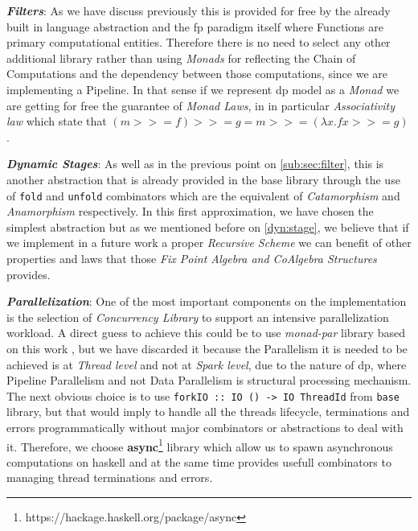 \documentclass[preprint]{elsarticle}
\begin{document}
\textbf{\textit{Filters}}\label{sub:sec:filter}: As we have discuss previously this is provided for free by the already built in language abstraction and the \acrshort{fp} paradigm itself where Functions are primary computational entities. Therefore there is no need to select any other additional library rather than using \emph{Monads} \citep{monads} for reflecting the Chain of Computations and the dependency between those computations, since we are implementing a Pipeline. In that sense if we represent \acrshort{dp} model as a \emph{Monad} we are getting for free the guarantee of \emph{Monad Laws}, in in particular \emph{Associativity law} which state that $(m >>= f ) >>= g = m >>= (\lambda x.f x >>= g)$ \citep{monadlaws}.

\textbf{\textit{Dynamic Stages}}: As well as in the previous point on \autoref{sub:sec:filter}, this is another abstraction that is already provided in the base library through the use of \texttt{fold} and \texttt{unfold} combinators which are the equivalent of \emph{Catamorphism} and \emph{Anamorphism} respectively. In this first approximation, we have chosen the simplest abstraction but as we mentioned before on \autoref{dyn:stage}, we believe that if we implement in a future work a proper \emph{Recursive Scheme} we can benefit of other properties and laws that those \emph{Fix Point Algebra and CoAlgebra Structures} \citep{lenses} provides. 

\textbf{\textit{Parallelization}}: One of the most important components on the implementation is the selection of \emph{Concurrency Library} to support an intensive parallelization workload. A direct guess to achieve this could be to use \textit{monad-par} library based on this work \citep{monadpar}, but we have discarded it because the Parallelism it is needed to be achieved is at \emph{Thread level} and not at \emph{Spark level}, due to the nature of \acrshort{dp}, where Pipeline Parallelism and not Data Parallelism is structural processing mechanism. The next obvious choice is to use \texttt{forkIO :: IO () -> IO ThreadId} from \texttt{base} library, but that would imply to handle all the threads lifecycle, terminations and errors programmatically without major combinators or abstractions to deal with it. Therefore, we choose \textbf{async}\footnote{https://hackage.haskell.org/package/async} 
library which allow us to spawn asynchronous computations \citep{parallelbook} on \acrshort{haskell} and at the same time provides usefull combinators to managing thread terminations and errors.
\end{document}
